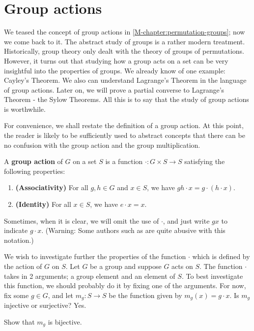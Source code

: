 \documentclass[./main.tex]{subfiles}
\begin{document}
\section{Group actions}
We teased the concept of group actions in \cref{M-chapter:permutation-groups}; now
we come back to it. The abstract study of groups is a rather modern treatment.
Historically, group theory only dealt with the theory of groups of permutations.
However, it turns out that studying how a group acts on a set can be very
insightful into the properties of groups. We already know of one example:
Cayley's Theorem. We also can understand Lagrange's Theorem in the language of
group actions. Later on, we will prove a partial converse to Lagrange's Theorem
- the Sylow Theorems. All this is to say that the study of group actions is
worthwhile.


For convenience, we shall restate the definition of a group action. At this
point, the reader is likely to be sufficiently used to abstract concepts that
there can be no confusion with the group action and the group multiplication.

\begin{definition}
\label{def:group-action-abstract}
    A \textbf{group action} of $G$ on a set $S$ is a function $\cdot: G \times S
    \to S$ satisfying the following properties:
    \begin{enumerate}[label=(\arabic*)]
        \item \textbf{(Associativity)} For all $g, h \in G$ and $x \in S$, we
        have $gh \cdot x = g \cdot (h \cdot x)$.
        \item \textbf{(Identity)} For all $x \in S$, we have $e \cdot x = x$.
    \end{enumerate}
\end{definition}
Sometimes, when it is clear, we will omit the use of $\cdot$, and just write
$gx$ to indicate $g \cdot x$. (Warning: Some authors such as
\autocite{Jacobson_2009} are quite abusive with this notation.)

We wish to investigate further the properties of the function $\cdot$ which is
defined by the action of $G$ on $S$. Let $G$ be a group and suppose $G$ acts on
$S$. The function $\cdot$ takes in 2 arguments; a group element and an element
of $S$. To best investigate this function, we should probably do it by fixing
one of the arguments. For now, fix some $g \in G$, and let $m_g: S \to S$ be the
function given by $m_g(x) = g \cdot x$. Is $m_g$ injective or surjective? Yes. 
\begin{exercise}
    Show that $m_g$ is bijective.
\end{exercise}
\end{document}
